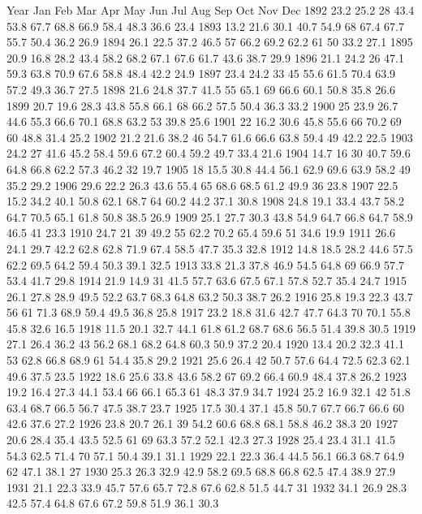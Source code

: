 Year	Jan	Feb	Mar	Apr	May	Jun	Jul	Aug	Sep	Oct	Nov	Dec
1892	23.2	25.2	28	43.4	53.8	67.7	68.8	66.9	58.4	48.3	36.6	23.4
1893	13.2	21.6	30.1	40.7	54.9	68	67.4	67.7	55.7	50.4	36.2	26.9
1894	26.1	22.5	37.2	46.5	57	66.2	69.2	62.2	61	50	33.2	27.1
1895	20.9	16.8	28.2	43.4	58.2	68.2	67.1	67.6	61.7	43.6	38.7	29.9
1896	21.1	24.2	26	47.1	59.3	63.8	70.9	67.6	58.8	48.4	42.2	24.9
1897	23.4	24.2	33	45	55.6	61.5	70.4	63.9	57.2	49.3	36.7	27.5
1898	21.6	24.8	37.7	41.5	55	65.1	69	66.6	60.1	50.8	35.8	26.6
1899	20.7	19.6	28.3	43.8	55.8	66.1	68	66.2	57.5	50.4	36.3	33.2
1900	25	23.9	26.7	44.6	55.3	66.6	70.1	68.8	63.2	53	39.8	25.6
1901	22	16.2	30.6	45.8	55.6	66	70.2	69	60	48.8	31.4	25.2
1902	21.2	21.6	38.2	46	54.7	61.6	66.6	63.8	59.4	49	42.2	22.5
1903	24.2	27	41.6	45.2	58.4	59.6	67.2	60.4	59.2	49.7	33.4	21.6
1904	14.7	16	30	40.7	59.6	64.8	66.8	62.2	57.3	46.2	32	19.7
1905	18	15.5	30.8	44.4	56.1	62.9	69.6	63.9	58.2	49	35.2	29.2
1906	29.6	22.2	26.3	43.6	55.4	65	68.6	68.5	61.2	49.9	36	23.8
1907	22.5	15.2	34.2	40.1	50.8	62.1	68.7	64	60.2	44.2	37.1	30.8
1908	24.8	19.1	33.4	43.7	58.2	64.7	70.5	65.1	61.8	50.8	38.5	26.9
1909	25.1	27.7	30.3	43.8	54.9	64.7	66.8	64.7	58.9	46.5	41	23.3
1910	24.7	21	39	49.2	55	62.2	70.2	65.4	59.6	51	34.6	19.9
1911	26.6	24.1	29.7	42.2	62.8	62.8	71.9	67.4	58.5	47.7	35.3	32.8
1912	14.8	18.5	28.2	44.6	57.5	62.2	69.5	64.2	59.4	50.3	39.1	32.5
1913	33.8	21.3	37.8	46.9	54.5	64.8	69	66.9	57.7	53.4	41.7	29.8
1914	21.9	14.9	31	41.5	57.7	63.6	67.5	67.1	57.8	52.7	35.4	24.7
1915	26.1	27.8	28.9	49.5	52.2	63.7	68.3	64.8	63.2	50.3	38.7	26.2
1916	25.8	19.3	22.3	43.7	56	61	71.3	68.9	59.4	49.5	36.8	25.8
1917	23.2	18.8	31.6	42.7	47.7	64.3	70	70.1	55.8	45.8	32.6	16.5
1918	11.5	20.1	32.7	44.1	61.8	61.2	68.7	68.6	56.5	51.4	39.8	30.5
1919	27.1	26.4	36.2	43	56.2	68.1	68.2	64.8	60.3	50.9	37.2	20.4
1920	13.4	20.2	32.3	41.1	53	62.8	66.8	68.9	61	54.4	35.8	29.2
1921	25.6	26.4	42	50.7	57.6	64.4	72.5	62.3	62.1	49.6	37.5	23.5
1922	18.6	25.6	33.8	43.6	58.2	67	69.2	66.4	60.9	48.4	37.8	26.2
1923	19.2	16.4	27.3	44.1	53.4	66	66.1	65.3	61	48.3	37.9	34.7
1924	25.2	16.9	32.1	42	51.8	63.4	68.7	66.5	56.7	47.5	38.7	23.7
1925	17.5	30.4	37.1	45.8	50.7	67.7	66.7	66.6	60	42.6	37.6	27.2
1926	23.8	20.7	26.1	39	54.2	60.6	68.8	68.1	58.8	46.2	38.3	20
1927	20.6	28.4	35.4	43.5	52.5	61	69	63.3	57.2	52.1	42.3	27.3
1928	25.4	23.4	31.1	41.5	54.3	62.5	71.4	70	57.1	50.4	39.1	31.1
1929	22.1	22.3	36.4	44.5	56.1	66.3	68.7	64.9	62	47.1	38.1	27
1930	25.3	26.3	32.9	42.9	58.2	69.5	68.8	66.8	62.5	47.4	38.9	27.9
1931	21.1	22.3	33.9	45.7	57.6	65.7	72.8	67.6	62.8	51.5	44.7	31
1932	34.1	26.9	28.3	42.5	57.4	64.8	67.6	67.2	59.8	51.9	36.1	30.3
